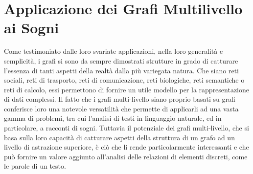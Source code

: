 \chapter{Applicazione dei Grafi Multilivello ai Sogni} \label{cap:applicazione-dei-grafi-multilivello-ai-sogni}

Come testimoniato dalle loro svariate applicazioni, nella loro generalità e semplicità, i grafi si sono da sempre
dimostrati strutture in grado di catturare l'essenza di tanti aspetti della realtà dalla più variegata natura.
Che siano reti sociali, reti di trasporto, reti di comunicazione, reti biologiche, reti semantiche o reti di calcolo,
essi permettono di fornire un utile modello per la rappresentazione di dati complessi.
Il fatto che i grafi multi-livello siano proprio basati su grafi conferisce loro una notevole versatilità che permette
di applicarli ad una vasta gamma di problemi, tra cui l'analisi di testi in linguaggio naturale,
ed in particolare, a racconti di sogni.
Tuttavia il potenziale dei grafi multi-livello, che si basa sulla loro capacità di catturare aspetti della struttura
di un grafo ad un livello di astrazione superiore, è ciò che li rende particolarmente interessanti e che può
fornire un valore aggiunto all'analisi delle relazioni di elementi discreti, come le parole di un testo.

